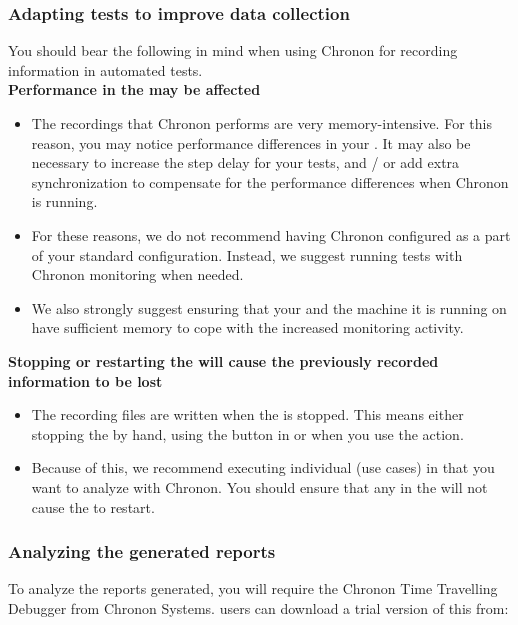 \subsubsection{Adapting tests to improve data collection}
You should bear the following in mind when using Chronon for recording information in automated tests.\\

\textbf{Performance in the \gdaut{} may be affected}
\begin{itemize}
\item The recordings that Chronon performs are very memory-intensive. For this reason, you may notice performance differences in your \gdaut{}. It may also be necessary to increase the step delay for your tests, and / or add extra synchronization to compensate for the performance differences when Chronon is running. 
\item For these reasons, we do not recommend having Chronon configured as a part of your standard \gdaut{} configuration. Instead, we suggest running tests with Chronon monitoring when needed. 
\item We also strongly suggest ensuring that your \gdaut{} and the machine it is running on have sufficient memory to cope with the increased monitoring activity.
\end{itemize}

\textbf{Stopping or restarting the \gdaut{} will cause the previously recorded information to be lost}
\begin{itemize}
\item The recording files are written when the \gdaut{} is stopped. This means either stopping the \gdaut{} by hand, using the  button in \app{} or when you use the  action. 
\item Because of this, we recommend executing individual \gdcases{} (use cases) in \gdsuites{} that you want to analyze with Chronon. You should ensure that any \gdehandlers{} in the \gdsuite{} will not cause the \gdaut{} to restart.
\end{itemize}

\subsubsection{Analyzing the generated reports}
\label{TasksChrononTools}
To analyze the reports generated, you will require the Chronon Time Travelling Debugger from Chronon Systems. \app{} users can download a trial version of this from:\\


